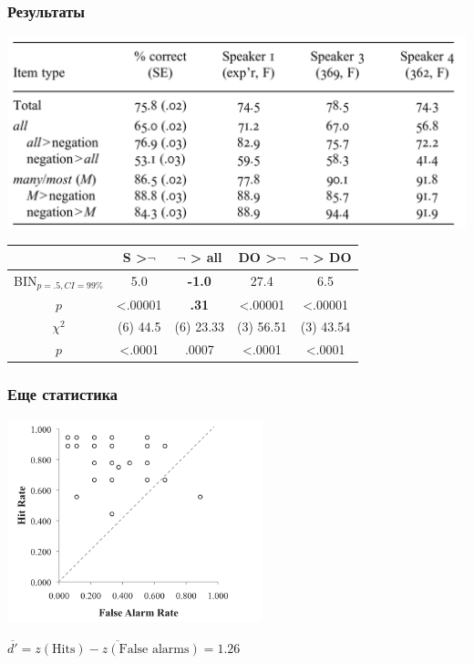 \documentclass{beamer}
\begin{document}
\begin{frame}
    \frametitle{Результаты}

    \includegraphics[width=\textwidth]{images/results 2.png}


    \pause

    \begin{table}[stats]
        \centering
        \begin{tabular}{c | c c | c c}
            &                      S >$\neg$ & $\neg$ > all & DO >$\neg$ & $\neg$ > DO\\
            \hline
            BIN$_{p=.5, CI=99\%}$ & 5.0        & \textbf{-1.0}       & 27.4        & 6.5\\
            $p$                   & <.00001    & \textbf{.31}        & <.00001     & <.00001\\
            \hline
            $\chi^2$              & (6) 44.5   & (6) 23.33  & (3) 56.51   & (3) 43.54\\
            $p$                   & <.0001     &.0007       & <.0001      & <.0001\\
        \end{tabular}
        \label{<stats2>}
    \end{table}

\end{frame}

\begin{frame}
    \frametitle{Еще статистика}

    \includegraphics[width=20em]{images/hit n miss 2.png}

    $\overline{d'} = \overline{z(\text{Hits}) - z(\text{False alarms})} = 1.26$

\end{frame}
\end{document}
